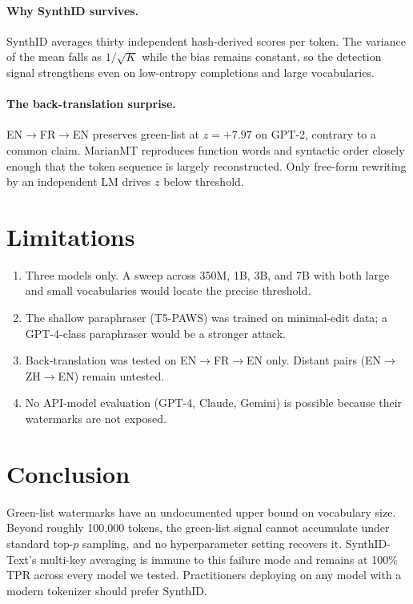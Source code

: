 \documentclass[11pt,a4paper]{article}
\begin{document}
\paragraph{Why SynthID survives.} SynthID averages thirty independent
hash-derived scores per token. The variance of the mean falls as
$1/\sqrt{K}$ while the bias remains constant, so the detection signal
strengthens even on low-entropy completions and large vocabularies.

\paragraph{The back-translation surprise.} EN$\to$FR$\to$EN preserves
green-list at $z = +7.97$ on GPT-2, contrary to a common claim.
MarianMT reproduces function words and syntactic order closely enough
that the token sequence is largely reconstructed. Only free-form
rewriting by an independent LM drives $z$ below threshold.

\section{Limitations}
\begin{enumerate}
\item Three models only. A sweep across 350M, 1B, 3B, and 7B with both
      large and small vocabularies would locate the precise threshold.
\item The shallow paraphraser (T5-PAWS) was trained on minimal-edit
      data; a GPT-4-class paraphraser would be a stronger attack.
\item Back-translation was tested on EN$\to$FR$\to$EN only.
      Distant pairs (EN$\to$ZH$\to$EN) remain untested.
\item No API-model evaluation (GPT-4, Claude, Gemini) is possible
      because their watermarks are not exposed.
\end{enumerate}

\section{Conclusion}
Green-list watermarks have an undocumented upper bound on vocabulary
size. Beyond roughly 100{,}000 tokens, the green-list signal cannot
accumulate under standard top-$p$ sampling, and no hyperparameter
setting recovers it. SynthID-Text's multi-key averaging is immune to
this failure mode and remains at 100\% TPR across every model we
tested. Practitioners deploying on any model with a modern tokenizer
should prefer SynthID.



\end{document}
